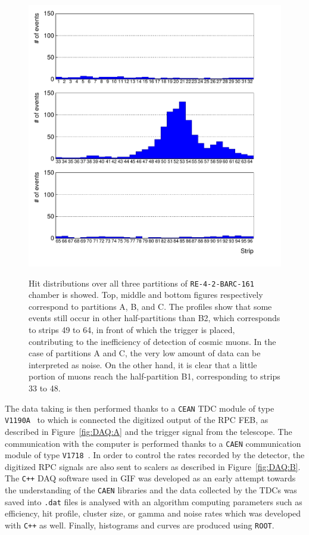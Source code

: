 		\begin{figure}[H]
		\centering
		\includegraphics[width = 0.7\plotwidth]{fig/chapt5/Data-21-profile.pdf}\\
		\caption{\label{fig:HitProf} Hit distributions over all three partitions of \texttt{RE-4-2-BARC-161} chamber is showed. Top, middle and bottom figures respectively correspond to partitions A, B, and C. The profiles show that some events still occur in other half-partitions than B2, which corresponds to strips 49 to 64, in front of which the trigger is placed, contributing to the inefficiency of detection of cosmic muons. In the case of partitions A and C, the very low amount of data can be interpreted as noise. On the other hand, it is clear that a little portion of muons reach the half-partition B1, corresponding to strips 33 to 48.}
	\end{figure}
	
	The data taking is then performed thanks to a \texttt{CEAN} TDC module of type \texttt{V1190A}~\cite{V1190AMUT} to which is connected the digitized output of the RPC \acl{FEB}, as described in Figure~\ref{fig:DAQ:A} and the trigger signal from the telescope. The communication with the computer is performed thanks to a \texttt{CAEN} communication module of type \texttt{V1718}~\cite{V1718MUT}. In order to control the rates recorded by the detector, the digitized RPC signals are also sent to scalers as described in Figure~\ref{fig:DAQ:B}. The \texttt{C++} DAQ software used in GIF was developed as an early attempt towards the understanding of the \texttt{CAEN} libraries and the data collected by the TDCs was saved into \texttt{.dat} files is analysed with an algorithm computing parameters such as efficiency, hit profile, cluster size, or gamma and noise rates which was developed with \texttt{C++} as well. Finally, histograms and curves are produced using \texttt{ROOT}.

